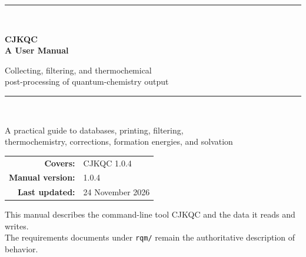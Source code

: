 \documentclass[11pt,a4paper]{article}
\newcommand{\ManualDate}{24 November 2026}
\newcommand{\ManualVersion}{1.0.4}
\newcommand{\CJKQC}{\textsf{CJKQC}}
\newcommand{\vibey}{%
  \raisebox{-2pt}{\color{red!85!black}\rotatebox{-9}{V}}%
  \kern-1pt\raisebox{1pt}{\color{orange!90!black}\rotatebox{7}{i}}%
  \kern-1pt\raisebox{-1pt}{\color{magenta!80!black}\rotatebox{-6}{b}}%
  \kern-1pt\raisebox{2pt}{\color{green!60!black}\rotatebox{8}{e}}%
  \kern-1pt\raisebox{-2pt}{\color{blue!85!black}\rotatebox{-8}{y}}%
}
\begin{document}

\begin{titlepage}
\thispagestyle{empty}
\centering
\vspace*{3.2cm}

{\color{deepblue}\rule{\textwidth}{1.2pt}}\\[0.8cm]
{\Huge\bfseries\color{deepblue} CJKQC\\[0.25cm] A \vibey{} User Manual\par}
\vspace{0.7cm}
{\Large Collecting, filtering, and thermochemical\\[0.15cm]
post-processing of quantum-chemistry output\par}
\vspace{0.6cm}
{\color{deepblue}\rule{\textwidth}{1.2pt}}\\[1.5cm]

{\large A practical guide to databases, printing, filtering,\\
thermochemistry, corrections, formation energies, and solvation\par}

\vfill

\begin{tabular}{rl}
\textbf{Covers:} & CJKQC \ManualVersion\\[2pt]
\textbf{Manual version:} & \ManualVersion\\[2pt]
\textbf{Last updated:} & \ManualDate\\
\end{tabular}

\vspace{1.2cm}
{\footnotesize This manual describes the command-line tool \CJKQC{} and the data it reads and writes.\\
The requirements documents under \texttt{rqm/} remain the authoritative description of behavior.}
\end{titlepage}

\tableofcontents
\clearpage











\appendix




\end{document}
